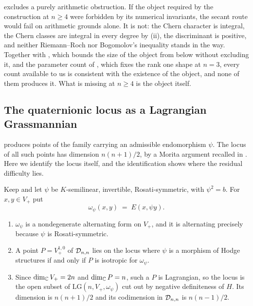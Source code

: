 \begin{remark}%
\label{rem:notforbidden}
 excludes a purely arithmetic obstruction. If the
object required by the construction at $n\ge4$ were forbidden by its
numerical invariants, the secant route would fail on arithmetic grounds
alone. It is not: the Chern character is integral, the Chern classes are
integral in every degree by (ii), the
discriminant is positive, and neither Riemann--Roch nor Bogomolov's
inequality stands in the way.
Together with , which bounds the size of the object from
below without excluding it, and the parameter count of ,
which fixes the rank one shape at $n=3$, every count available to us is
consistent with the existence of the object, and none of them produces it.
What is missing at $n\ge4$ is the object itself.
\end{remark}

\subsection{The quaternionic locus as a Lagrangian Grassmannian}
\label{ssec:lagrangian}

 produces points of the family carrying an admissible
endomorphism $\psi$. The locus of all such points has dimension $n(n+1)/2$,
by a Morita argument recalled in . Here we identify the locus
itself, and the identification shows where the residual difficulty lies.

\begin{proposition}\label{prop:lagrangian}
Keep  and let $\psi$ be $K$-semilinear, invertible,
Rosati-symmetric, with $\psi^{2}=b$. For $x,y\in V_{+}$ put
\[
  \omega_{\psi}(x,y)\;=\;E(x,\psi y).
\]
\begin{enumerate}[label=\textup{(\roman*)},nosep]
\item $\omega_{\psi}$ is a nondegenerate alternating form on $V_{+}$, and it
  is alternating precisely because $\psi$ is Rosati-symmetric.
\item A point $P=V_{+}^{1,0}$ of $\mathcal{D}_{n,n}$ lies on the locus where $\psi$
  is a morphism of Hodge structures if and only if $P$ is isotropic for
  $\omega_{\psi}$.
\item Since $\dim_{\mathbb{C}}V_{+}=2n$ and $\dim_{\mathbb{C}}P=n$, such a $P$ is
  Lagrangian, so the locus is the open subset of
  $\mathrm{LG}(n,V_{+},\omega_{\psi})$ cut out by negative definiteness of
  $H$. Its dimension is $n(n+1)/2$ and its codimension in $\mathcal{D}_{n,n}$ is
  $n(n-1)/2$.
\end{enumerate}
\end{proposition}


